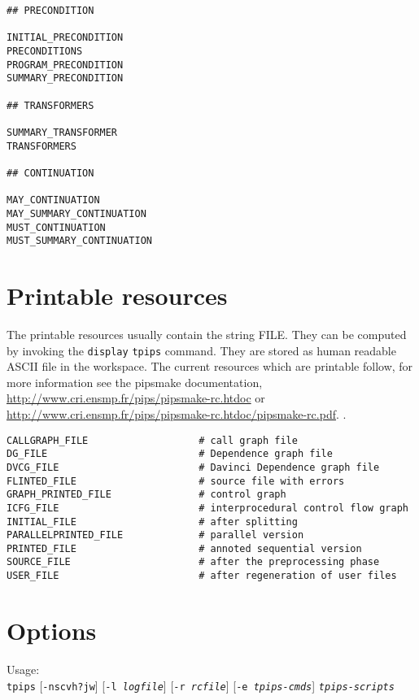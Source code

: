 \documentclass[a4paper,12pt]{article}
\newcommand{\PipsPIPSmakePDF}{\url{http://www.cri.ensmp.fr/pips/pipsmake-rc.htdoc/pipsmake-rc.pdf}\xspace}
\newcommand{\PipsPIPSmakeHTDOC}{\url{http://www.cri.ensmp.fr/pips/pipsmake-rc.htdoc}\xspace}
\begin{document}
\begin{verbatim}
## PRECONDITION                   

INITIAL_PRECONDITION                    
PRECONDITIONS    
PROGRAM_PRECONDITION
SUMMARY_PRECONDITION

## TRANSFORMERS 

SUMMARY_TRANSFORMER
TRANSFORMERS 

## CONTINUATION 

MAY_CONTINUATION
MAY_SUMMARY_CONTINUATION
MUST_CONTINUATION
MUST_SUMMARY_CONTINUATION
\end{verbatim}


\section{Printable resources}
\label{resf}

The printable resources usually contain the string FILE. They can be
computed by invoking the \verb+display+ {\tt tpips} command. They are
stored as human readable ASCII file in the workspace. The current
resources which are printable follow, for more information see the
pipsmake documentation, \PipsPIPSmakeHTDOC or \PipsPIPSmakePDF.  .

\begin{verbatim}
CALLGRAPH_FILE                   # call graph file
DG_FILE                          # Dependence graph file         
DVCG_FILE                        # Davinci Dependence graph file 
FLINTED_FILE                     # source file with errors
GRAPH_PRINTED_FILE               # control graph
ICFG_FILE                        # interprocedural control flow graph       
INITIAL_FILE                     # after splitting      
PARALLELPRINTED_FILE             # parallel version
PRINTED_FILE                     # annoted sequential version 
SOURCE_FILE                      # after the preprocessing phase
USER_FILE                        # after regeneration of user files
\end{verbatim}


\section{Options}

Usage:\\
\texttt{tpips} [\texttt{-nscvh?jw}] [\texttt{-l \emph{logfile}}]
[\texttt{-r \emph{rcfile}}] [\texttt{-e \emph{tpips-cmds}}]
\texttt{\emph{tpips-scripts}}
\end{document}
